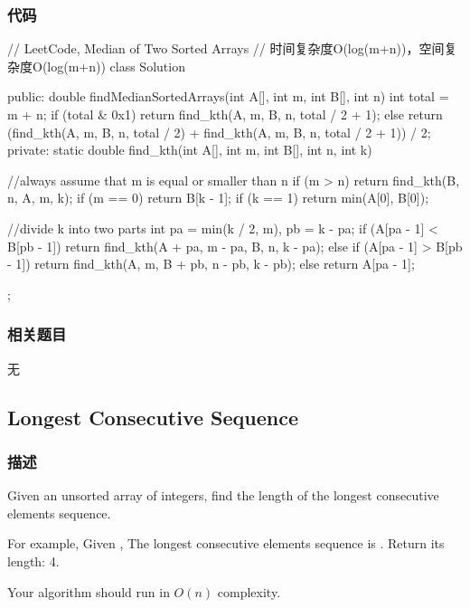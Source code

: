 \subsubsection{代码}
\begin{Code}
// LeetCode, Median of Two Sorted Arrays
// 时间复杂度O(log(m+n))，空间复杂度O(log(m+n))
class Solution {
public:
    double findMedianSortedArrays(int A[], int m, int B[], int n) {
        int total = m + n;
        if (total & 0x1)
            return find_kth(A, m, B, n, total / 2 + 1);
        else
            return (find_kth(A, m, B, n, total / 2)
                    + find_kth(A, m, B, n, total / 2 + 1)) / 2;
    }
private:
    static double find_kth(int A[], int m, int B[], int n, int k) {
        //always assume that m is equal or smaller than n
        if (m > n) return find_kth(B, n, A, m, k);
        if (m == 0) return B[k - 1];
        if (k == 1) return min(A[0], B[0]);

        //divide k into two parts
        int pa = min(k / 2, m), pb = k - pa;
        if (A[pa - 1] < B[pb - 1])
            return find_kth(A + pa, m - pa, B, n, k - pa);
        else if (A[pa - 1] > B[pb - 1])
            return find_kth(A, m, B + pb, n - pb, k - pb);
        else
            return A[pa - 1];
    }
};
\end{Code}


\subsubsection{相关题目}

\begindot
\item 无
\myenddot


\subsection{Longest Consecutive Sequence} %
\label{sec:longest-consecutive-sequence}


\subsubsection{描述}
Given an unsorted array of integers, find the length of the longest consecutive elements sequence.

For example,
Given \code{[100, 4, 200, 1, 3, 2]},
The longest consecutive elements sequence is \code{[1, 2, 3, 4]}. Return its length: 4.

Your algorithm should run in $O(n)$ complexity.


